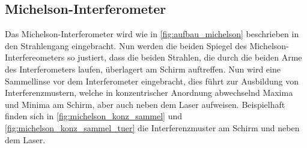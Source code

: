 \documentclass[ngerman]{scrartcl}
\begin{document}
\subsection{Michelson-Interferometer}
\label{sec:durchfuehrung_michelson}

Das Michelson-Interferometer wird wie in \autoref{fig:aufbau_michelson} beschrieben in den Strahlengang eingebracht. Nun werden die beiden Spiegel des Michelson-Interfereometers so justiert, dass die beiden Strahlen, die durch die beiden Arme des Interferometers laufen, überlagert am Schirm auftreffen. Nun wird eine Sammellinse vor dem Interferometer eingebracht, dies führt zur Ausbildung von Interferenzmustern, welche in konzentrischer Anordnung abwechselnd Maxima und Minima am Schirm, aber auch neben dem Laser aufweisen. Beispielhaft finden sich in \autoref{fig:michelson_konz_sammel} und \autoref{fig:michelson_konz_sammel_tuer} die Interferenzmuster am Schirm und neben dem Laser.
%
\setcapindent{0pt}
\end{document}
